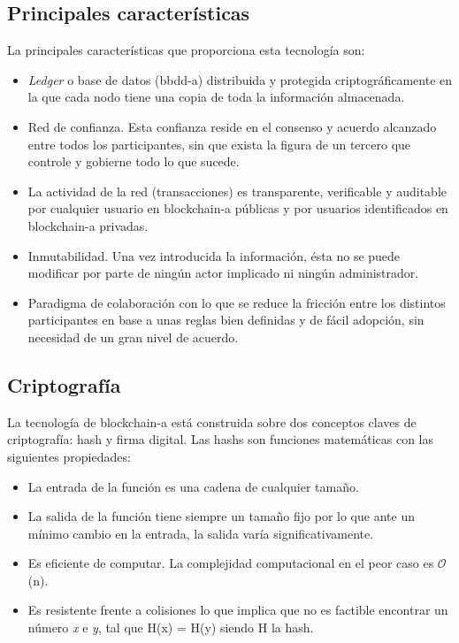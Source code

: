 \documentclass[12pt,a4paper, twoside]{report}
\begin{document}
	\subsection{Principales características}
	
	La principales características que proporciona esta tecnología son: 
	
	\begin{itemize}
		\item \textit{Ledger} o base de datos (\gls{bbdd-a}) distribuida y  protegida criptográficamente en la que cada nodo tiene una copia de toda la información almacenada.		
		\item Red de confianza. Esta confianza reside en el consenso y acuerdo alcanzado entre todos los participantes, sin que exista la figura de un tercero que controle y gobierne todo lo que sucede.
		\item La actividad de la red (transacciones) es transparente, verificable y auditable por cualquier usuario en \gls{blockchain-a} públicas y por usuarios identificados en \gls{blockchain-a} privadas.
		\item Inmutabilidad. Una vez introducida la información, ésta no se puede modificar por parte de ningún actor implicado ni ningún administrador.
		\item Paradigma de colaboración con lo que se reduce la fricción entre  los distintos participantes en base a unas reglas bien definidas y de fácil adopción, sin necesidad de un gran nivel de acuerdo.
	\end{itemize}	
	
	\subsection{Criptografía}
	
	La tecnología de \gls{blockchain-a} está construida sobre dos conceptos claves de criptografía: \gls{hash} y firma digital. Las \glspl{hash} son funciones matemáticas con las siguientes propiedades:
	
	\begin{itemize}
		\item La entrada de la función es una cadena de cualquier tamaño.
		\item La salida de la función tiene siempre un tamaño fijo por lo que ante un mínimo cambio en la entrada, la salida varía significativamente.
		\item Es eficiente de computar. La complejidad computacional en el peor caso es $\mathcal{O}$(n).
		\item Es resistente frente a colisiones lo que implica que no es factible encontrar un número \textit{x} e \textit{y}, tal que H(x) = H(y) siendo H la \gls{hash}.
	\end{itemize}	
	
\end{document}
